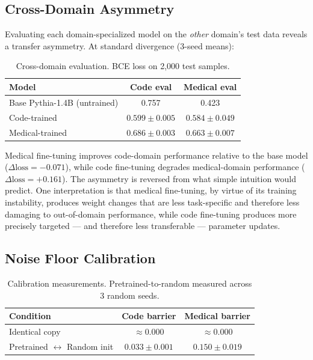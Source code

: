 \documentclass[11pt,a4paper]{article}
\begin{document}
\subsection{Cross-Domain Asymmetry}

Evaluating each domain-specialized model on the \emph{other} domain's test data reveals a transfer asymmetry. At standard divergence (3-seed means):

\begin{table}[h]
\centering
\caption{Cross-domain evaluation. BCE loss on 2,000 test samples.}
\label{tab:asymmetry}
\begin{tabular}{@{}lcc@{}}
\toprule
\textbf{Model} & \textbf{Code eval} & \textbf{Medical eval} \\
\midrule
Base Pythia-1.4B (untrained) & 0.757 & 0.423 \\
Code-trained                & $0.599 \pm 0.005$ & $0.584 \pm 0.049$ \\
Medical-trained             & $0.686 \pm 0.003$ & $0.663 \pm 0.007$ \\
\bottomrule
\end{tabular}
\end{table}

Medical fine-tuning improves code-domain performance relative to the base model ($\Delta\text{loss} = -0.071$), while code fine-tuning degrades medical-domain performance ($\Delta\text{loss} = +0.161$). The asymmetry is reversed from what simple intuition would predict. One interpretation is that medical fine-tuning, by virtue of its training instability, produces weight changes that are less task-specific and therefore less damaging to out-of-domain performance, while code fine-tuning produces more precisely targeted — and therefore less transferable — parameter updates.

\subsection{Noise Floor Calibration}

\begin{table}[h]
\centering
\caption{Calibration measurements. Pretrained-to-random measured across 3 random seeds.}
\label{tab:noisefloor}
\begin{tabular}{@{}lcc@{}}
\toprule
\textbf{Condition} & \textbf{Code barrier} & \textbf{Medical barrier} \\
\midrule
Identical copy          & $\approx 0.000$            & $\approx 0.000$ \\
Pretrained $\leftrightarrow$ Random init & $0.033 \pm 0.001$ & $0.150 \pm 0.019$ \\
\bottomrule
\end{tabular}
\end{table}
\end{document}
